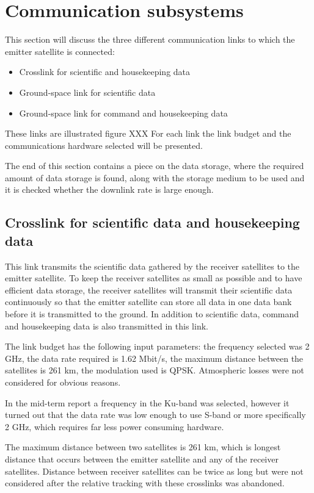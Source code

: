 \section{Communication subsystems}
This section will discuss the  three different communication links to which the emitter satellite is connected:
\begin{itemize}
\item Crosslink for scientific and housekeeping data
\item Ground-space link for scientific data
\item Ground-space link for command and housekeeping data
\end{itemize}

These links are illustrated figure XXX
For each link the link budget and the communications hardware selected will be presented.

The end of this section contains a piece on the data storage, where the required amount of data storage is found, along with the storage medium to be used and it is checked whether the downlink rate is large enough.


\subsection{Crosslink for scientific data and housekeeping data}
\label{Crossem}
This link transmits the scientific data gathered by the receiver satellites to the emitter satellite. To keep the receiver satellites as small as possible and to have efficient data storage, the receiver satellites will transmit their scientific data continuously so that the emitter satellite can store all data in one data bank before it is transmitted to the ground. In addition to scientific data, command and housekeeping data is also transmitted in this link.

The link budget has the following input parameters: the frequency selected was 2 GHz, the data rate required is 1.62 Mbit/s, the maximum distance between the satellites is 261 km, the modulation used is QPSK. Atmospheric losses were not considered for obvious reasons.

In the mid-term report a frequency in the Ku-band was selected, however it turned out that the data rate was low enough to use S-band or more specifically 2 GHz, which requires far less power consuming hardware.

The maximum distance between two satellites is 261 km, which is longest distance that occurs between the emitter satellite and any of the receiver satellites. Distance between receiver satellites can be twice as long but were not considered after the relative tracking with these crosslinks was abandoned.

